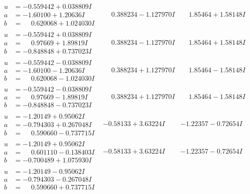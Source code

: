 \documentclass[1p]{elsarticle_modified}
\theoremstyle{definition}
\begin{document}
$$\begin{array}{c|c|c}
\begin{aligned}
u &= -0.559442 + 0.038809 I \\
a &= -1.60100 + 1.20636 I \\
b &= \phantom{-}0.620068 + 1.024030 I\end{aligned}
 & \phantom{-}0.388234 - 1.127970 I & \phantom{-}1.85464 + 1.58148 I \\ \hline\begin{aligned}
u &= -0.559442 + 0.038809 I \\
a &= \phantom{-}0.97669 + 1.89819 I \\
b &= -0.848848 + 0.737023 I\end{aligned}
 & \phantom{-}0.388234 - 1.127970 I & \phantom{-}1.85464 + 1.58148 I \\ \hline\begin{aligned}
u &= -0.559442 - 0.038809 I \\
a &= -1.60100 - 1.20636 I \\
b &= \phantom{-}0.620068 - 1.024030 I\end{aligned}
 & \phantom{-}0.388234 + 1.127970 I & \phantom{-}1.85464 - 1.58148 I \\ \hline\begin{aligned}
u &= -0.559442 - 0.038809 I \\
a &= \phantom{-}0.97669 - 1.89819 I \\
b &= -0.848848 - 0.737023 I\end{aligned}
 & \phantom{-}0.388234 + 1.127970 I & \phantom{-}1.85464 - 1.58148 I \\ \hline\begin{aligned}
u &= -1.20149 + 0.95062 I \\
a &= -0.794303 + 0.267048 I \\
b &= \phantom{-}0.590660 - 0.737715 I\end{aligned}
 & -0.58133 + 3.63224 I & -1.22357 - 0.72654 I \\ \hline\begin{aligned}
u &= -1.20149 + 0.95062 I \\
a &= \phantom{-}0.601110 - 0.138403 I \\
b &= -0.700489 + 1.075930 I\end{aligned}
 & -0.58133 + 3.63224 I & -1.22357 - 0.72654 I \\ \hline\begin{aligned}
u &= -1.20149 - 0.95062 I \\
a &= -0.794303 - 0.267048 I \\
b &= \phantom{-}0.590660 + 0.737715 I\end{aligned}

\end{array}$$
\end{document}

